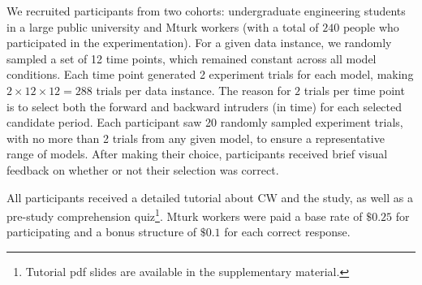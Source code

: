\documentclass[letterpaper]{article} %
\newcommand{\kibitz}[2]{\ifnum\Comments=1{\textcolor{#1}{#2}}\fi}
\newcommand{\nh}[1]{\kibitz{blue}{[NH:#1]}}
\begin{document}
We recruited participants from two cohorts: undergraduate engineering students in a large public university
and Mturk workers (with a total of $240$ people who participated in the experimentation).
For a given data instance, we randomly sampled a set of 12 time points, which  remained constant across all model conditions.
Each time point generated 2 experiment trials for each model, making $2 \times 12 \times 12=288$ trials per data instance. The reason for $2$ trials per time point is to select both the forward and backward intruders (in time) for each selected candidate period. Each participant saw 20 randomly sampled experiment trials, with no more than 2 trials from any given model, to ensure a representative range of models.
After making their choice, participants received brief visual feedback on whether or not their selection was correct.

All participants received a detailed tutorial about CW and the study, as well as a pre-study comprehension quiz\footnote{Tutorial pdf slides are available in the supplementary material.}. Mturk workers were paid a base rate of $\$0.25$ for participating and a bonus structure of $\$0.1$ for each correct response.


\end{document}
